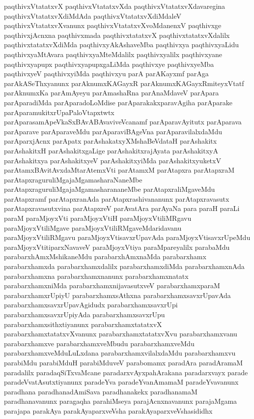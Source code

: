 {paqthivxVtatatxvX
paqthivxVtatatxvXda
paqthivxVtatatxvXdavaregina
paqthivxVtatatxvXdiMdAda
paqthivxVtatatxvXdiMdaleV
paqthivxVtatatxvXvanunx
paqthivxVtatatxvXvoMdanenxV
paqthivxge
paqthivxjAcnxna
paqthivxmada
paqthivxtatatxvX
paqthivxtatatxvXdalilx
paqthivxtatatxvXdiMda
paqthivxyAkAshaveMba
paqthivxya
paqthivxyaLidu
paqthivxyaMtAvara
paqthivxyaMteMdalilx
paqthivxyalilx
paqthivxyane
paqthivxyapupx
paqthivxyapupxgaLiMda
paqthivxye
paqthivxyeMba
paqthivxyeV
paqthivxyiMda
paqthivxyu
parA
parAKayxmf
parAga
parAkASeThxyanunx
parAknumxKAGayxR
parAknumxKAGayxRmiteyxVtatf
parAknumxKa
parAmAyeyu
parAmashaRna
parAnaMdaveV
parApara
parAparadiMda
parAparadoLoMdise
parAparakakxparavAgiha
parAparake
parAparamukitxrUpaPaloVtapxtwtx
parAparasamApeVkaSxBAvABAvaviveVcanamf
parAparavAyitutx
parAparava
parAparave
parAparaveMdu
parAparaviBAgeVna
parAparavilalxdaMdu
parAparxjAcnx
parApatx
parAshakatxyXMshaBeVdataH
parAshakitx
parAshakitxH
parAshakitxgaLige
parAshakitxrajAyata
parAshakitxyA
parAshakitxya
parAshakitxyeV
parAshakitxyiMda
parAshakitxyuketxV
parAtamxBAvitAvxdaMtarAtemxVti
parAtamxM
parAtapxra
parAtapxraM
parAtapxraguruliMgajaMgamasharaNaneMbe
parAtapxraguruliMgajaMgamasharananeMbe
parAtapxraliMgaveMdu
parAtapxramf
parAtapxranAda
parAtapxrashivananunx
parAtapxravasutx
parAtapxravasutxvina
parAtapxreV
parAvatAra
parAyaNa
para
paraH
paraLi
paraM
paraMjoyxVti
paraMjoyxVtiH
paraMjoyxVtiliMRgavu
paraMjoyxVtiliMgave
paraMjoyxVtiliRMgaveMdaridavanu
paraMjoyxVtiliRMgavu
paraMjoyxVtisavxrUpavAda
paraMjoyxVtisavxrUpeMdu
paraMjoyxVtitiparxNavaveV
paraMjoyxVtiya
paraMpareyalilx
parabaMdu
parabarxhAmxMshikaneMdu
parabarxhAmxnaMda
parabarxhamx
parabarxhamxda
parabarxhamxdalilx
parabarxhamxdiMda
parabarxhamxnAda
parabarxhamxna
parabarxhamxnanunx
parabarxhamxnatatx
parabarxhamxniMda
parabarxhamxnijavasutxveV
parabarxhamxparaM
parabarxhamxrUpiyU
parabarxhamxsAthxna
parabarxhamxsavxrUpavAda
parabarxhamxsavxrUpavAgidudx
parabarxhamxsavxrUpi
parabarxhamxsavxrUpiyAda
parabarxhamxsavxrUpu
parabarxhamxsithxtiyanunx
parabarxhamxtatatxvX
parabarxhamxtatatxvXvanunx
parabarxhamxtatatxvXvu
parabarxhamxvanu
parabarxhamxve
parabarxhamxveMbudu
parabarxhamxveMdu
parabarxhamxveMduLuLxdana
parabarxhamxvilalxdaMdu
parabarxhamxvu
parabiMdu
parabiMduH
parabiMduveV
parabomamx
paradAra
paradAramaM
paradalilx
paradaqSiTxvaMcane
paradarxvAyxpahArakana
paradarxvayx
parade
paradeVvatAsutxtiyanunx
paradeYva
paradeYvanAmamaM
paradeYvavanunx
paradhana
paradhanadAmiSava
paradhanakekx
paradhanamaM
paradhanavanunx
paragaqha
parahiMseya
parajAcnxnavanunx
parajaMgama
parajapa
parakAya
parakAyaparxveVsha
parakAyaparxveVshasididhx
}
